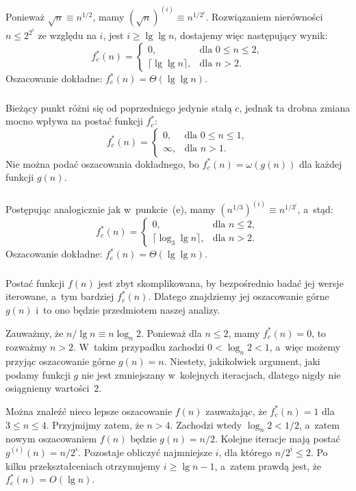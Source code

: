 \subsubsection{} %
Ponieważ $\sqrt{n}\equiv n^{1/2}$, mamy $(\sqrt{n})^{(i)}\equiv n^{1/2^i}$. Rozwiązaniem nierówności $n\le2^{2^i}$ ze względu na $i$, jest $i\ge\lg\lg n$, dostajemy więc następujący wynik:
\[
	f_c^*(n) =
	\begin{cases}
		0, & \text{dla $0\le n\le2$}, \\
		\lceil\lg\lg n\rceil, & \text{dla $n>2$}.
	\end{cases}
\]
Oszacowanie dokładne: $f_c^*(n)=\Theta(\lg\lg n)$.

\subsubsection{} %
Bieżący punkt różni się od poprzedniego jedynie stałą $c$, jednak ta drobna zmiana mocno wpływa na postać funkcji $f_c^*$:
\[
	f_c^*(n) =
	\begin{cases}
		0, & \text{dla $0\le n\le1$}, \\
		\infty, & \text{dla $n>1$}.
	\end{cases}
\]
Nie można podać oszacowania dokładnego, bo $f_c^*(n)=\omega(g(n))$ dla każdej funkcji $g(n)$.

\subsubsection{} %
Postępując analogicznie jak w~punkcie~(e), mamy $\left(n^{1/3}\right)^{(i)}\equiv n^{1/3^i}$, a~stąd:
\[
	f_c^*(n) =
	\begin{cases}
		0, & \text{dla $n\le2$}, \\
		\lceil\log_3\lg n\rceil, & \text{dla $n>2$}.
	\end{cases}
\]
Oszacowanie dokładne: $f_c^*(n)=\Theta(\lg\lg n)$.

\subsubsection{} %
Postać funkcji $f(n)$ jest zbyt skomplikowana, by bezpośrednio badać jej wersje iterowane, a~tym bardziej $f_c^*(n)$. Dlatego znajdziemy jej oszacowanie górne $g(n)$ i~to ono będzie przedmiotem naszej analizy.

Zauważmy, że $n/\!\lg n\equiv n\log_n\!2$. Ponieważ dla $n\le2$, mamy $f_c^*(n)=0$, to rozważmy $n>2$. W~takim przypadku zachodzi $0<\log_n\!2<1$, a~więc możemy przyjąc oszacowanie górne $g(n)=n$. Niestety, jakikolwiek argument, jaki podamy funkcji $g$ nie jest zmniejszany w~kolejnych iteracjach, dlatego nigdy nie osiągniemy wartości~2.

Można znaleźć nieco lepsze oszacowanie $f(n)$ zauważając, że $f_c^*(n)=1$ dla $3\le n\le4$. Przyjmijmy zatem, że $n>4$. Zachodzi wtedy $\log_n\!2<1/2$, a~zatem nowym oszacowaniem $f(n)$ będzie $g(n)=n/2$. Kolejne iteracje mają postać $g^{(i)}(n)=n/2^i$. Pozostaje obliczyć najmniejsze $i$, dla którego $n/2^i\le2$. Po kilku przekształceniach otrzymujemy $i\ge\lg n-1$, a~zatem prawdą jest, że $f_c^*(n)=O(\lg n)$.

\endinput
